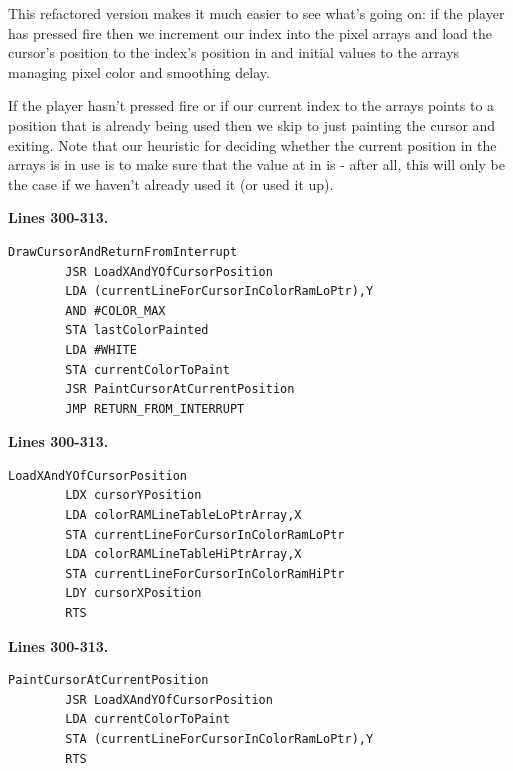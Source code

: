 This refactored version makes it much easier to see what's going on: if the player has pressed fire then we increment
our index into the pixel arrays and load the cursor's position to the index's position in 
and initial values to the arrays managing pixel color and smoothing delay.

If the player hasn't pressed fire or if our current index to the arrays points to a position that is already being used then
we skip to just painting the cursor and exiting. Note that our heuristic for deciding whether the current position in the 
arrays is in use is to make sure that the value at  in  is  - 
after all, this will only be the case if we haven't already used it (or used it up).

\clearpage
\textbf{Lines 300-313. }
\begin{lstlisting}[caption = Paint the cursor and call the system default interrupt handler \icode{RETURN\_FROM\_INTERRUPT}]
DrawCursorAndReturnFromInterrupt   
        JSR LoadXAndYOfCursorPosition
        LDA (currentLineForCursorInColorRamLoPtr),Y
        AND #COLOR_MAX
        STA lastColorPainted
        LDA #WHITE
        STA currentColorToPaint
        JSR PaintCursorAtCurrentPosition
        JMP RETURN_FROM_INTERRUPT

\end{lstlisting}

\bigskip
\textbf{Lines 300-313. }
\begin{lstlisting}[caption= Load the X and Y position and set up \icode{currentLineForCursorInColorRamLoPtr/currentLineForCursorInColorRamHiPtr}
for painting the cursor.]
LoadXAndYOfCursorPosition   
        LDX cursorYPosition
        LDA colorRAMLineTableLoPtrArray,X
        STA currentLineForCursorInColorRamLoPtr
        LDA colorRAMLineTableHiPtrArray,X
        STA currentLineForCursorInColorRamHiPtr
        LDY cursorXPosition
        RTS 
\end{lstlisting}
\bigskip
\textbf{Lines 300-313. }
\begin{lstlisting}[caption = Paint the cursor.]
PaintCursorAtCurrentPosition   
        JSR LoadXAndYOfCursorPosition
        LDA currentColorToPaint
        STA (currentLineForCursorInColorRamLoPtr),Y
        RTS 
\end{lstlisting}
\clearpage

